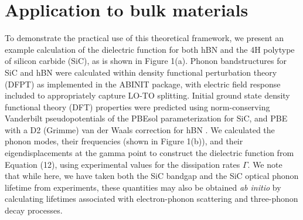 \documentclass[aps,prb,twocolumn,
	groupedaddress,superscriptaddress,
	amsfonts,amssymb,amsmath,floatfix,
	citeautoscript]{revtex4-1}
\begin{document}
\section{Application to bulk materials}
To demonstrate the practical use of this theoretical framework, we present an example calculation of the dielectric function for both hBN and the 4H polytype of silicon carbide (SiC), as is shown in Figure 1(a). 
Phonon bandstructures for SiC and hBN were calculated within density functional perturbation
theory (DFPT) as implemented in the ABINIT package\cite{abinit1,abinit2,abinit3,Gonze1997dynamical,Hamann2005metric}, with electric field response included to appropriately capture LO-TO splitting. Initial ground state density functional theory (DFT) properties were predicted using norm-conserving Vanderbilt pseudopotentials of the PBEsol parameterization for SiC, and PBE with a D2 (Grimme) van der Waals correction for hBN \cite{PBEsol,PBE,ONCV_PPs,pseudodojo,grimme}. We calculated the phonon modes, their frequencies (shown in Figure 1(b)), and their eigendisplacements at the gamma point to construct the dielectric function from Equation (12), using experimental values for the dissipation rates $\Gamma$. We note that while here, we have taken both the SiC bandgap and the SiC optical phonon lifetime from experiments, these quantities may also be obtained \emph{ab initio} by calculating lifetimes associated with electron-phonon scattering and three-phonon decay processes. 
\end{document}
